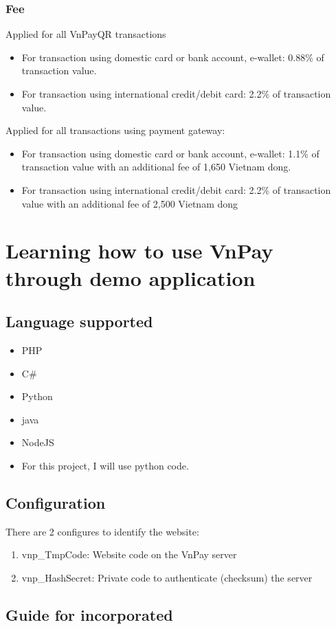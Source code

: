 \documentclass[12pt,a4paper]{article}
\begin{document}
	\subsubsection{Fee}
	Applied for all VnPayQR transactions
	\begin{itemize}
		\item For transaction using domestic card or bank account, e-wallet: 0.88\% of transaction value.
		\item For transaction using international credit/debit card: 2.2\% of transaction value.
	\end{itemize}
	Applied for all transactions using payment gateway:
	\begin{itemize}
		\item For transaction using domestic card or bank account, e-wallet: 1.1\% of transaction value with an additional fee of 1,650 Vietnam dong.
		\item For transaction using international credit/debit card: 2.2\% of transaction value with an additional fee of 2,500 Vietnam dong
	\end{itemize}
\section{Learning how to use VnPay through demo application}
\subsection{Language supported}
\begin{itemize}
	\item PHP
	\item C\#
	\item Python
	\item java
	\item NodeJS
	\item For this project, I will use python code.
\end{itemize}
\subsection{Configuration}
There are 2 configures to identify the website:
\begin{enumerate}
	\item vnp\_TmpCode: Website code on the VnPay server
	\item vnp\_HashSecret: Private code to authenticate (checksum) the server
\end{enumerate}
\subsection{Guide for incorporated}
\end{document}
